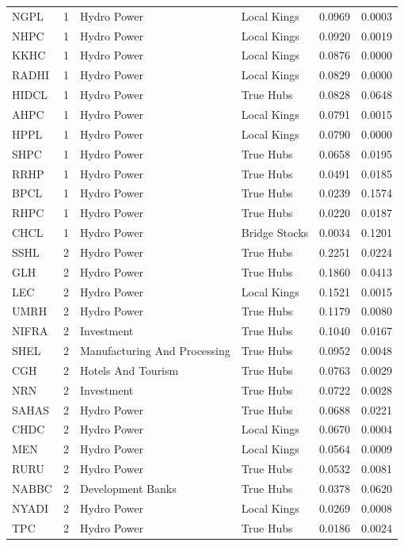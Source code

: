 \begin{longtable}{l r l l r r}
NGPL & 1 & Hydro Power & Local Kings & 0.0969 & 0.0003 \\
NHPC & 1 & Hydro Power & Local Kings & 0.0920 & 0.0019 \\
KKHC & 1 & Hydro Power & Local Kings & 0.0876 & 0.0000 \\
RADHI & 1 & Hydro Power & Local Kings & 0.0829 & 0.0000 \\
HIDCL & 1 & Hydro Power & True Hubs & 0.0828 & 0.0648 \\
AHPC & 1 & Hydro Power & Local Kings & 0.0791 & 0.0015 \\
HPPL & 1 & Hydro Power & Local Kings & 0.0790 & 0.0000 \\
SHPC & 1 & Hydro Power & True Hubs & 0.0658 & 0.0195 \\
RRHP & 1 & Hydro Power & True Hubs & 0.0491 & 0.0185 \\
BPCL & 1 & Hydro Power & True Hubs & 0.0239 & 0.1574 \\
RHPC & 1 & Hydro Power & True Hubs & 0.0220 & 0.0187 \\
CHCL & 1 & Hydro Power & Bridge Stocks & 0.0034 & 0.1201 \\
SSHL & 2 & Hydro Power & True Hubs & 0.2251 & 0.0224 \\
GLH & 2 & Hydro Power & True Hubs & 0.1860 & 0.0413 \\
LEC & 2 & Hydro Power & Local Kings & 0.1521 & 0.0015 \\
UMRH & 2 & Hydro Power & True Hubs & 0.1179 & 0.0080 \\
NIFRA & 2 & Investment & True Hubs & 0.1040 & 0.0167 \\
SHEL & 2 & Manufacturing And Processing & True Hubs & 0.0952 & 0.0048 \\
CGH & 2 & Hotels And Tourism & True Hubs & 0.0763 & 0.0029 \\
NRN & 2 & Investment & True Hubs & 0.0722 & 0.0028 \\
SAHAS & 2 & Hydro Power & True Hubs & 0.0688 & 0.0221 \\
CHDC & 2 & Hydro Power & Local Kings & 0.0670 & 0.0004 \\
MEN & 2 & Hydro Power & Local Kings & 0.0564 & 0.0009 \\
RURU & 2 & Hydro Power & True Hubs & 0.0532 & 0.0081 \\
NABBC & 2 & Development Banks & True Hubs & 0.0378 & 0.0620 \\
NYADI & 2 & Hydro Power & Local Kings & 0.0269 & 0.0008 \\
TPC & 2 & Hydro Power & True Hubs & 0.0186 & 0.0024 \\

\end{longtable}
